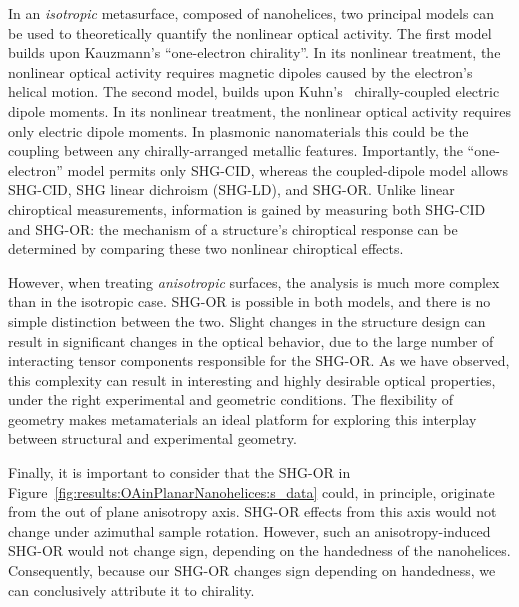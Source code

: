 In an \textit{isotropic} metasurface, composed of nanohelices, two principal models can be used to theoretically quantify the nonlinear optical activity. The first model builds upon Kauzmann's ``one-electron chirality''.\cite{Kauzmann1957a}
In its nonlinear treatment, the nonlinear optical activity requires magnetic dipoles caused by the electron's helical motion.\cite{Hache2001a}
The second model, builds upon Kuhn's~\cite{Kuhn1930} chirally-coupled electric dipole moments. In its nonlinear treatment, the nonlinear optical activity requires only electric dipole moments.\cite{Hache2001a}
In plasmonic nanomaterials this could be the coupling between any chirally-arranged metallic features. Importantly, the ``one-electron'' model permits only SHG-CID, whereas the coupled-dipole model allows SHG-CID, SHG linear dichroism (SHG-LD), and SHG-OR.\cite{Fischer2005a}
Unlike linear chiroptical measurements, information is gained by measuring both SHG-CID and SHG-OR: the mechanism of a structure's chiroptical response can be determined by comparing these two nonlinear chiroptical effects. 

However, when treating \textit{anisotropic} surfaces, the analysis is much more complex than in the isotropic case. SHG-OR is possible in both models, and there is no simple distinction between the two. Slight changes in the structure design can result in significant changes in the optical behavior, due to the large number of interacting tensor components responsible for the SHG-OR. As we have observed, this complexity can result in interesting and highly desirable optical properties, under the right experimental and geometric conditions. The flexibility of geometry makes metamaterials an ideal platform for exploring this interplay between structural and experimental geometry. 

Finally, it is important to consider that the SHG-OR in Figure~\ref{fig:results:OAinPlanarNanohelices:s_data} could, in principle, originate from the out of plane anisotropy axis. SHG-OR effects from this axis would not change under azimuthal sample rotation. However, such an anisotropy-induced SHG-OR would not change sign, depending on the handedness of the nanohelices. Consequently, because our SHG-OR changes sign depending on handedness, we can conclusively attribute it to chirality. 

